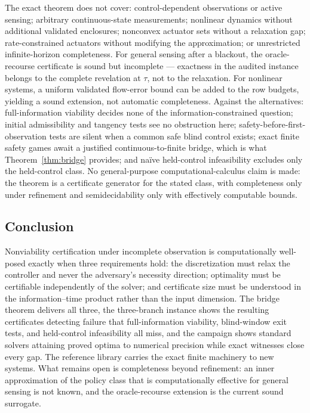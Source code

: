 \documentclass[10pt,twocolumn]{article}
\theoremstyle{plain}
\theoremstyle{definition}
\theoremstyle{remark}
\begin{document}
The exact theorem does not cover: control-dependent observations or active
sensing; arbitrary continuous-state measurements; nonlinear dynamics without
additional validated enclosures; nonconvex actuator sets without a
relaxation gap; rate-constrained actuators without modifying the
approximation; or unrestricted infinite-horizon completeness. For general
sensing after a blackout, the oracle-recourse certificate is sound but
incomplete --- exactness in the audited instance belongs to the complete
revelation at \(\tau\), not to the relaxation. For nonlinear systems, a uniform validated flow-error bound can
be added to the row budgets, yielding a sound extension, not automatic
completeness. Against the alternatives: full-information viability decides
none of the information-constrained question; initial admissibility and
tangency tests see no obstruction here; safety-before-first-observation
tests are silent when a common safe blind control exists; exact finite
safety games await a justified continuous-to-finite bridge, which is what
Theorem~\ref{thm:bridge} provides; and na\"ive held-control infeasibility
excludes only the held-control class. No general-purpose
computational-calculus claim is made: the theorem is a certificate generator
for the stated class, with completeness only under refinement and
semidecidability only with effectively computable bounds.

\subsection{Conclusion}\label{conclusion}

Nonviability certification under incomplete observation is computationally
well-posed exactly when three requirements hold: the discretization must
relax the controller and never the adversary's necessity direction;
optimality must be certifiable independently of the solver; and certificate
size must be understood in the information--time product rather than the
input dimension. The bridge theorem delivers all three, the three-branch
instance shows the resulting certificates detecting failure that
full-information viability, blind-window exit tests, and held-control
infeasibility all miss, and the campaign shows standard solvers attaining
proved optima to numerical precision while exact witnesses close every gap.
The reference library carries the exact finite machinery to new systems.
What remains open is completeness beyond refinement: an inner
approximation of the policy class that is computationally effective for
general sensing is not known, and the oracle-recourse extension is the
current sound surrogate.
\end{document}
